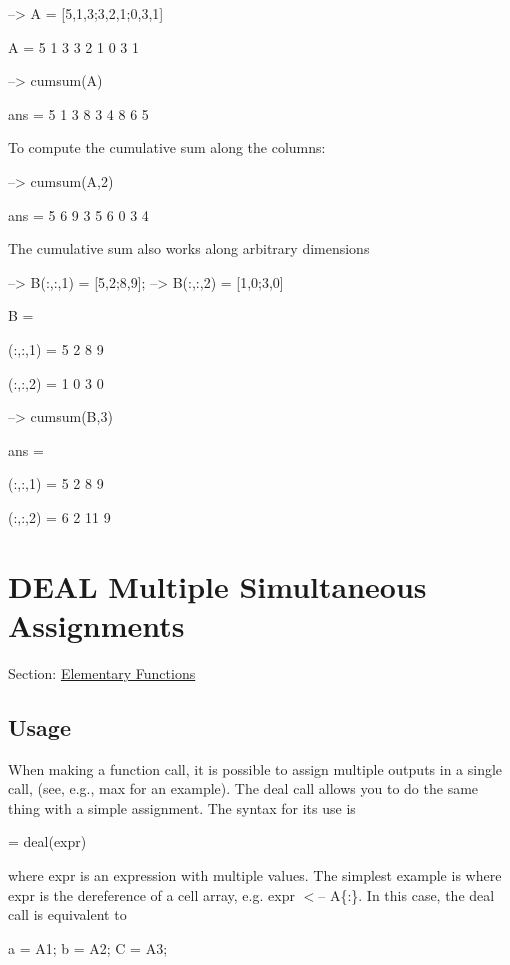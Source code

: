 \begin{DoxyVerbInclude}
--> A = [5,1,3;3,2,1;0,3,1]

A = 
 5 1 3 
 3 2 1 
 0 3 1 

--> cumsum(A)

ans = 
 5 1 3 
 8 3 4 
 8 6 5 
\end{DoxyVerbInclude}


To compute the cumulative sum along the columns\-:


\begin{DoxyVerbInclude}
--> cumsum(A,2)

ans = 
 5 6 9 
 3 5 6 
 0 3 4 
\end{DoxyVerbInclude}


The cumulative sum also works along arbitrary dimensions


\begin{DoxyVerbInclude}
--> B(:,:,1) = [5,2;8,9];
--> B(:,:,2) = [1,0;3,0]

B = 

(:,:,1) = 
 5 2 
 8 9 

(:,:,2) = 
 1 0 
 3 0 

--> cumsum(B,3)

ans = 

(:,:,1) = 
  5  2 
  8  9 

(:,:,2) = 
  6  2 
 11  9 
\end{DoxyVerbInclude}
 \hypertarget{elementary_deal}{}\section{D\-E\-A\-L Multiple Simultaneous Assignments}\label{elementary_deal}
Section\-: \hyperlink{sec_elementary}{Elementary Functions} \hypertarget{vtkwidgets_vtkxyplotwidget_Usage}{}\subsection{Usage}\label{vtkwidgets_vtkxyplotwidget_Usage}
When making a function call, it is possible to assign multiple outputs in a single call, (see, e.\-g., {\ttfamily max} for an example). The {\ttfamily deal} call allows you to do the same thing with a simple assignment. The syntax for its use is \begin{DoxyVerb}   [a,b,c,...] = deal(expr)
\end{DoxyVerb}
 where {\ttfamily expr} is an expression with multiple values. The simplest example is where {\ttfamily expr} is the dereference of a cell array, e.\-g. {\ttfamily expr $<$-- A\{\-:\}}. In this case, the {\ttfamily deal} call is equivalent to \begin{DoxyVerb}   a = A{1}; b = A{2}; C = A{3}; 
\end{DoxyVerb}
